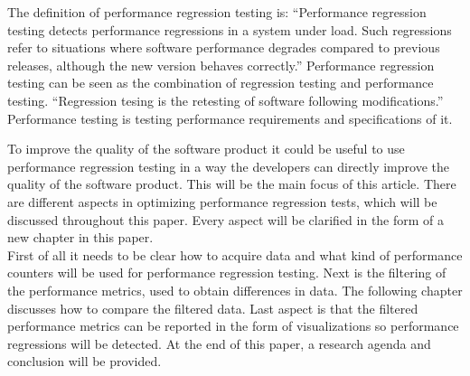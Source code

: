 The definition of performance regression testing is: ``Performance regression testing detects performance
regressions in a system under load. Such regressions refer to
situations where software performance degrades compared to
previous releases, although the new version behaves correctly.''\cite{foo2010mining}
Performance regression testing can be seen as the combination of regression testing and performance testing. ``Regression tesing is the retesting of software following modifications.''\cite{rothermel2001prioritizing} Performance testing is testing performance requirements and specifications of it.\cite{gan2006software}

To improve the quality of the software product it could be useful to use performance regression testing in a way the developers can
directly improve the quality of the software product. This will be the main focus of this article. There are different aspects in optimizing performance regression tests, which will be discussed throughout this paper. Every aspect will be clarified in the form of a new chapter in this paper. \\ First of all it needs to be clear how to acquire data and what kind of performance counters will be used for performance regression testing. Next is the filtering of the performance metrics, used to obtain differences in data. The following chapter discusses how to compare the filtered data. Last aspect is that the filtered performance metrics can be reported in the form of visualizations so performance regressions will be detected. At the end of this paper, a research agenda and conclusion will be provided.
